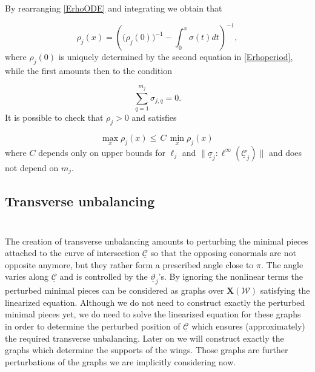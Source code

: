 \documentclass[12pt,namelimits,sumlimits]{amsart}
\theoremstyle{remark}
\numberwithin{equation}{section}
\begin{document}
By rearranging \ref{ErhoODE} and integrating we obtain that 
\addtocounter{theorem}{1}
\begin{equation}
\label{ErhoODEsol}
\rho_j(x)=\left({(\rho}_j(0))^{-1}-\int_0^x\sigma(t)dt\right)^{-1},
\end{equation}
where $\rho_j(0)$ is uniquely determined by the second equation in \ref{Erhoperiod},
while the first amounts then to the condition
\addtocounter{theorem}{1}
\begin{equation}
\label{Erhocondition}
\sum_{q=1}^{m_j}
\sigma_{{j,q}}
=0.
\end{equation}
It is possible to check that $\rho_j>0$ and satisfies
\addtocounter{theorem}{1}
\begin{equation}
\label{Erhobound}
\max_x \rho_j(x)
\le
\,
C\,\min_x \rho_j(x)\,
\end{equation}
where $C$
depends only on upper bounds for $\ell_j$ and $\|\underline{\sigma}_j:\ell^\infty({\underline{{\mathcal{C}}}}_j)\|$
and does not depend on $m_j$.

\subsection*{Transverse unbalancing}
$\phantom{ab}$
\nopagebreak

The creation of transverse unbalancing amounts to perturbing the minimal pieces attached to
the curve of intersection ${\underline{{\mathcal{C}}}}$ so that the opposing conormals are not opposite anymore,
but they rather form a prescribed angle close to $\pi$.
The angle varies along ${\underline{{\mathcal{C}}}}$ and is controlled by the $\underline{\vartheta}_j$'s.
By ignoring the nonlinear terms the perturbed minimal pieces can be considered as graphs over ${\boldsymbol{X}}({{\mathcal{W}}})$
satisfying the linearized equation.
Although we do not need to construct exactly the perturbed minimal pieces yet,
we do need to solve the linearized equation for these graphs in order to determine
the perturbed position of ${\underline{{\mathcal{C}}}}$ which ensures (approximately)
the required transverse unbalancing.
Later on we will construct exactly the graphs which determine the supports of the wings.
Those graphs are further perturbations of the graphs we are implicitly considering now.
\end{document}
